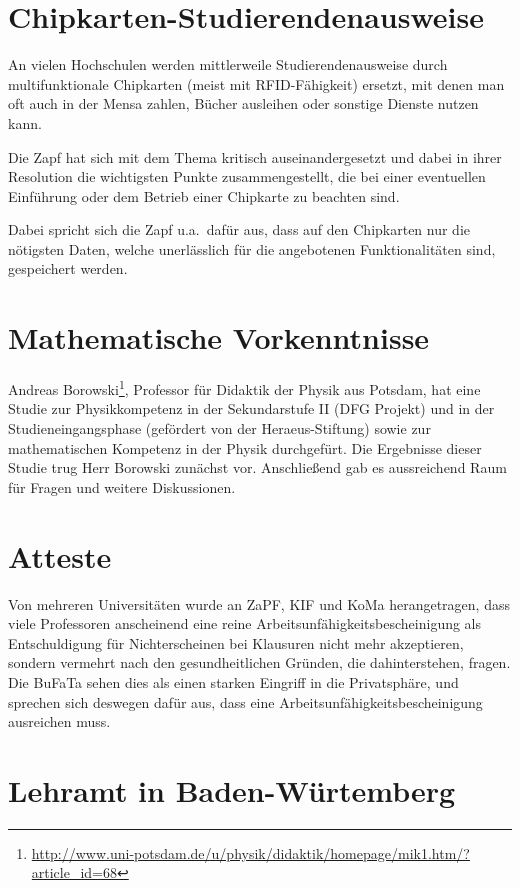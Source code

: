 \documentclass{scrartcl}
\begin{document}
\section*{Chipkarten-Studierendenausweise}

An vielen Hochschulen werden mittlerweile Studierendenausweise durch
multifunktionale Chipkarten (meist mit RFID-Fähigkeit) ersetzt, mit denen man
oft auch in der Mensa zahlen, Bücher ausleihen oder sonstige Dienste nutzen
kann.

Die Zapf hat sich mit dem Thema kritisch auseinandergesetzt und dabei in ihrer
Resolution die wichtigsten Punkte zusammengestellt, die bei einer eventuellen
Einführung oder dem Betrieb einer Chipkarte zu beachten sind.

Dabei spricht sich die Zapf u.a.\ dafür aus, dass auf den Chipkarten nur die
nötigsten Daten, welche unerlässlich für die angebotenen Funktionalitäten sind,
gespeichert werden.

\section*{Mathematische Vorkenntnisse}

Andreas Borowski\footnote{\href{http://www.uni-potsdam.de/u/physik/didaktik/homepage/mik1.htm/?article_id=68}{\url{http://www.uni-potsdam.de/u/physik/didaktik/homepage/mik1.htm/?article_id=68}}},
Professor für Didaktik der Physik aus Potsdam, hat eine Studie zur Physikkompetenz
in der Sekundarstufe II (DFG Projekt) und in der Studieneingangsphase
(gefördert von der Heraeus-Stiftung) sowie zur mathematischen Kompetenz in
der Physik durchgefürt. Die Ergebnisse dieser Studie trug Herr Borowski
zunächst vor. Anschließend gab es aussreichend Raum für Fragen und weitere
Diskussionen.

\section*{Atteste}

Von mehreren Universitäten wurde an ZaPF, KIF und KoMa herangetragen, dass
viele Professoren anscheinend eine reine Arbeitsunfähigkeitsbescheinigung als
Entschuldigung für Nichterscheinen bei Klausuren nicht mehr akzeptieren,
sondern vermehrt nach den gesundheitlichen Gründen, die dahinterstehen, fragen.
Die BuFaTa sehen dies als einen starken Eingriff in die Privatsphäre, und
sprechen sich deswegen dafür aus, dass eine Arbeitsunfähigkeitsbescheinigung
ausreichen muss.

\section*{Lehramt in Baden-Würtemberg}
\end{document}
